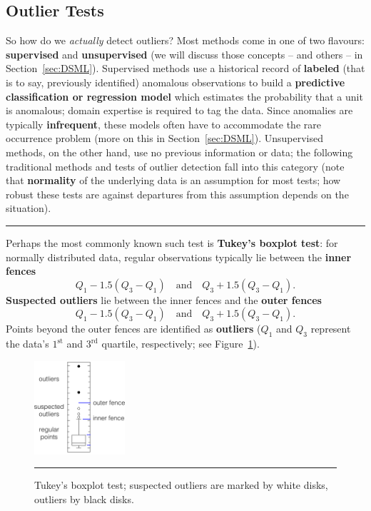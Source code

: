 \subsection{Outlier Tests} So how do we \textit{actually} detect outliers? Most methods come in one of two flavours: \textbf{supervised} and \textbf{unsupervised} (we will discuss those concepts -- and others -- in Section~\ref{sec:DSML}).\newl 
Supervised methods use a historical record of \textbf{labeled} (that is to say, previously identified) anomalous observations to build a \textbf{predictive classification or regression model} which estimates the probability that a unit is anomalous; domain expertise is required to tag the data. Since anomalies are typically \textbf{infrequent}, these models often have to accommodate the rare occurrence problem (more on this in Section~\ref{sec:DSML}). Unsupervised methods, on the other hand, use no previous information or data; the following traditional methods and tests of outlier detection fall into this category (note that \textbf{normality} of the underlying data is an assumption for most tests; how robust these tests are against departures from this assumption depends on the situation).
\begin{center}
    \rule{0.5\textwidth}{.4pt}
\end{center}
Perhaps the most commonly known such test is \textbf{Tukey's boxplot test}: for normally distributed data, regular observations typically lie between the \textbf{inner fences} $$Q_1-1.5(Q_3-Q_1) \quad\mbox{and}\quad Q_3+1.5(Q_3-Q_1).$$ \textbf{Suspected outliers} lie between the inner fences and the \textbf{outer fences} 
$$Q_1-1.5(Q_3-Q_1) \quad\mbox{and}\quad Q_3+1.5(Q_3-Q_1).$$
Points beyond the outer fences are identified as \textbf{outliers} ($Q_1$ and $Q_3$ represent the data's   $1^{\textrm{st}}$ and $3^{\textrm{rd}}$ quartile, respectively; see Figure~\ref{fig:boxplot}).
\begin{figure}[t]
\centering
\includegraphics[width=0.30\textwidth]{Images/boxplot.png}
\caption[\small Tukey's boxplot test for outliers]{\small Tukey's boxplot test; suspected outliers are marked by white disks, outliers by black disks.}
\hrule\label{fig:boxplot}
\end{figure}
